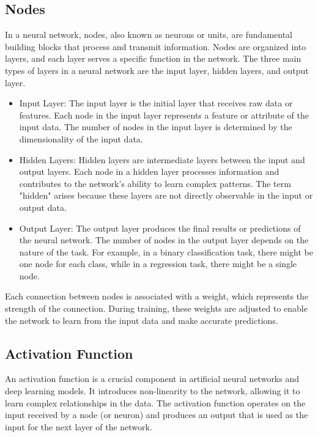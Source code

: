 \subsection{Nodes}
In a neural network, nodes, also known as neurons or units, are fundamental building blocks that process and transmit information. Nodes are organized into layers, and each layer serves a specific function in the network. The three main types of layers in a neural network are the input layer, hidden layers, and output layer.
\begin{itemize}
    \item Input Layer:
        The input layer is the initial layer that receives raw data or features.
        Each node in the input layer represents a feature or attribute of the input data.
        The number of nodes in the input layer is determined by the dimensionality of the input data.
    \item Hidden Layers:
        Hidden layers are intermediate layers between the input and output layers.
        Each node in a hidden layer processes information and contributes to the network's ability to learn complex patterns.
        The term "hidden" arises because these layers are not directly observable in the input or output data.
    \item Output Layer:
        The output layer produces the final results or predictions of the neural network.
        The number of nodes in the output layer depends on the nature of the task. For example, in a binary \cite{chowdhury2020improving}classification task, there might be one node for each class, while in a regression task, there might be a single node.
\end{itemize}



Each connection between nodes is associated with a weight, which represents the strength of the connection. During training, these weights are adjusted to enable the network to learn from the input data and make accurate predictions.
\subsection{Activation Function}
An activation function is a crucial component in artificial neural networks and deep learning models. It introduces non-linearity to the network, allowing it to learn complex relationships in the data. The activation function operates on the input received by a node (or neuron) and produces an output that is used as the input for the next layer of the network.

